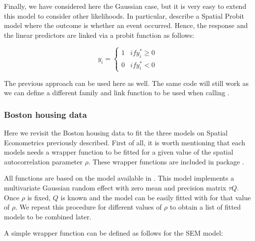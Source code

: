 \documentclass[article]{jss}
\begin{document}
Finally, we have considered here the Gaussian case, but it is very easy to
extend this model to consider other likelihoods. In particular,
\citet{LeSageetal:2011} describe a Spatial Probit model where the outcome is
whether an event occurred. Hence, the response and the linear predictors are
linked via a probit function as follows:

\begin{equation}
y_i=
\left\{
\begin{array}{cc}
1 & if y^*_i\geq 0\\
0 & if y^*_i < 0
\end{array}
\right.
\end{equation}

The previous approach can be used here as well. The same code will still work
as we can define a different family and link function to be used when calling
.

\subsubsection{Boston housing data}

Here we revisit the Boston housing data to fit the three models on Spatial
Econometrics previously described. First of all, it is worth mentioning that
each models needs a wrapper function to be fitted for a given value of the
spatial autocorrelation parameter $\rho$. These wrapper functions are included
in  package .

All functions are based on the  model available in  .
This model implements a multivariate Gaussian random effect with zero mean
and precision matrix $\tau Q$. Once $\rho$ is fixed, $Q$ is
known and the model can be easily fitted with  for that value of
$\rho$. We repeat this procedure for different values of $\rho$ to
obtain a list of fitted models to be combined later.

A simple wrapper function can be defined as follows for the SEM model:

\begin{Schunk}
\end{Schunk}
\end{document}
